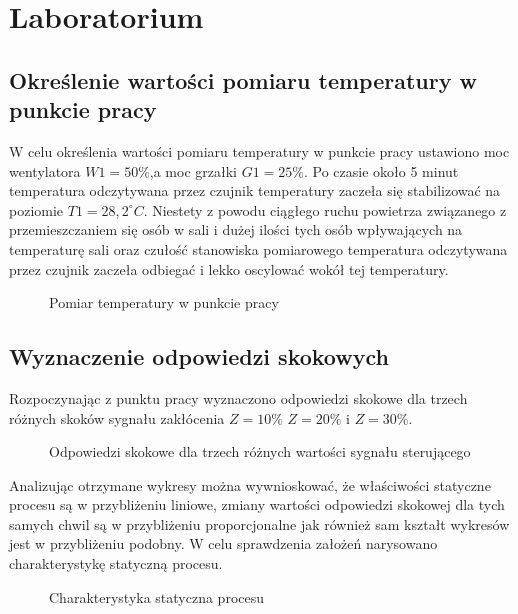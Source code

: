 \chapter{Laboratorium}

\section{Określenie wartości pomiaru temperatury w punkcie pracy}

W celu określenia wartości pomiaru temperatury w punkcie pracy ustawiono moc wentylatora  $W1 = 50\%$,a moc grzałki $G1 = 25\%$.
Po czasie około 5 minut temperatura odczytywana przez czujnik temperatury zaczeła się stabilizować  na poziomie  $T1 = 28,2^{\circ} C$. 
Niestety z powodu ciągłego ruchu powietrza związanego z przemieszczaniem się osób w sali i dużej ilości tych osób wpływających na temperaturę sali oraz czułość stanowiska pomiarowego temperatura odczytywana przez czujnik zaczeła odbiegać i lekko oscylować wokół tej temperatury.

\begin{figure}[H]
\centering

\caption{Pomiar temperatury w punkcie pracy}
\end{figure}

\section{Wyznaczenie odpowiedzi skokowych}

Rozpoczynając z punktu pracy wyznaczono odpowiedzi skokowe dla trzech różnych skoków sygnału zakłócenia  $Z = 10\%$  $Z = 20\%$ i $Z = 30\%$.

\begin{figure}[H]
\centering

\caption{Odpowiedzi skokowe dla trzech różnych wartości sygnału sterującego}
\end{figure}

Analizując otrzymane wykresy można wywnioskować, że właściwości statyczne procesu są w przybliżeniu liniowe, zmiany wartości odpowiedzi skokowej dla tych samych chwil są w przybliżeniu proporcjonalne jak również sam kształt wykresów jest w przybliżeniu podobny. W celu sprawdzenia założeń narysowano charakterystykę statyczną procesu.

\begin{figure}[H]
\centering

\caption{Charakterystyka statyczna procesu}
\end{figure}

